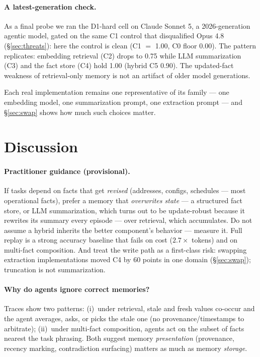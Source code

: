 \documentclass[journal]{IEEEtran}
\begin{document}
\paragraph{A latest-generation check.} As a final probe we ran the D1-hard
cell on Claude Sonnet 5, a 2026-generation agentic model, gated on the same
C1 control that disqualified Opus 4.8 (\S\ref{sec:threats}): here the control is clean (C1 $=$ 1.00, C0 floor
0.00). The pattern replicates: embedding retrieval (C2) drops to 0.75 while
LLM summarization (C3) and the fact store (C4) hold 1.00 (hybrid C5 0.90).
The updated-fact weakness of retrieval-only memory is not an artifact of
older model generations.

Each real implementation remains one representative of its family --- one
embedding model, one summarization prompt, one extraction prompt --- and
\S\ref{sec:swap} shows how much such choices matter.

\section{Discussion}\label{sec:discussion}

\paragraph{Practitioner guidance (provisional).}
If tasks depend on facts that get \emph{revised} (addresses, configs,
schedules --- most operational facts), prefer a memory that \emph{overwrites
state} --- a structured fact store, or LLM summarization, which turns out to
be update-robust because it rewrites its summary every episode --- over
retrieval, which accumulates. Do not assume a hybrid inherits the better
component's behavior --- measure it. Full replay is a strong accuracy
baseline that fails on cost ($2.7\times$ tokens) and on multi-fact
composition. And treat the write path as a first-class risk: swapping
extraction implementations moved C4 by 60 points in one domain
(\S\ref{sec:swap}); truncation is not summarization.

\paragraph{Why do agents ignore correct memories?}
Traces show two patterns: (i)~under retrieval, stale and fresh values
co-occur and the agent averages, asks, or picks the stale one (no
provenance/timestamps to arbitrate); (ii)~under multi-fact composition,
agents act on the subset of facts nearest the task phrasing. Both suggest
memory \emph{presentation} (provenance, recency marking, contradiction
surfacing) matters as much as memory \emph{storage}.
\end{document}

